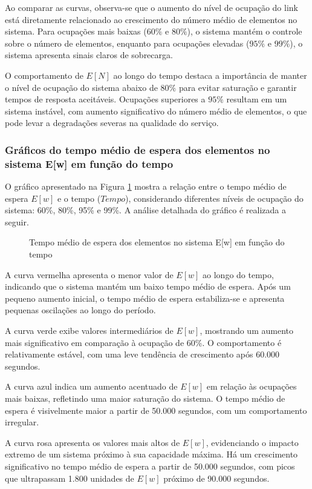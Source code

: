 Ao comparar as curvas, observa-se que o aumento do nível de ocupação do link está diretamente relacionado ao crescimento do número médio de elementos no sistema. Para ocupações mais baixas (\(60\%\) e \(80\%\)), o sistema mantém o controle sobre o número de elementos, enquanto para ocupações elevadas (\(95\%\) e \(99\%\)), o sistema apresenta sinais claros de sobrecarga.

O comportamento de \(E[N]\) ao longo do tempo destaca a importância de manter o nível de ocupação do sistema abaixo de \(80\%\) para evitar saturação e garantir tempos de resposta aceitáveis. Ocupações superiores a \(95\%\) resultam em um sistema instável, com aumento significativo do número médio de elementos, o que pode levar a degradações severas na qualidade do serviço.


\subsubsection{Gráficos do tempo médio de espera dos elementos no sistema E[w] em função do tempo}
O gráfico apresentado na Figura \ref{fig:eWE2} mostra a relação entre o tempo médio de espera $E[w]$ e o tempo ($Tempo$), considerando diferentes níveis de ocupação do sistema: 60\%, 80\%, 95\% e 99\%. A análise detalhada do gráfico é realizada a seguir.

\begin{figure}[h!]
   \centering
   
   \caption{Tempo médio de espera dos elementos no sistema E[w] em função do tempo}
   \label{fig:eWE2}
\end{figure}
A curva vermelha apresenta o menor valor de $E[w]$ ao longo do tempo, indicando que o sistema mantém um baixo tempo médio de espera. Após um pequeno aumento inicial, o tempo médio de espera estabiliza-se e apresenta pequenas oscilações ao longo do período.

A curva verde exibe valores intermediários de $E[w]$, mostrando um aumento mais significativo em comparação à ocupação de 60\%. O comportamento é relativamente estável, com uma leve tendência de crescimento após 60.000 segundos.

A curva azul indica um aumento acentuado de $E[w]$ em relação às ocupações mais baixas, refletindo uma maior saturação do sistema. O tempo médio de espera é visivelmente maior a partir de 50.000 segundos, com um comportamento irregular.

A curva rosa apresenta os valores mais altos de $E[w]$, evidenciando o impacto extremo de um sistema próximo à sua capacidade máxima. Há um crescimento significativo no tempo médio de espera a partir de 50.000 segundos, com picos que ultrapassam 1.800 unidades de $E[w]$ próximo de 90.000 segundos.

